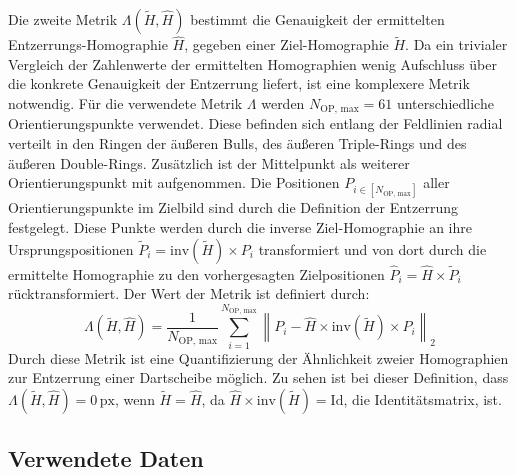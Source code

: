 Die zweite Metrik $\Lambda(\widetilde{H}, \widehat{H})$ bestimmt die Genauigkeit der ermittelten Entzerrungs-Homographie $\widehat{H}$, gegeben einer Ziel-Homographie $\widetilde{H}$. Da ein trivialer Vergleich der Zahlenwerte der ermittelten Homographien wenig Aufschluss über die konkrete Genauigkeit der Entzerrung liefert, ist eine komplexere Metrik notwendig. Für die verwendete Metrik $\Lambda$ werden $N_\text{OP, max}=61$ unterschiedliche Orientierungspunkte verwendet. Diese befinden sich entlang der Feldlinien radial verteilt in den Ringen der äußeren Bulls, des äußeren Triple-Rings und des äußeren Double-Rings. Zusätzlich ist der Mittelpunkt als weiterer Orientierungspunkt mit aufgenommen. Die Positionen $P_{i \in [N_\text{OP, max}]}$ aller Orientierungspunkte im Zielbild sind durch die Definition der Entzerrung festgelegt. Diese Punkte werden durch die inverse Ziel-Homographie an ihre Ursprungspositionen $\widetilde{P}_i = \mathrm{inv}(\widetilde{H}) \times P_i$ transformiert und von dort durch die ermittelte Homographie zu den vorhergesagten Zielpositionen $\widehat{P}_i = \widehat{H} \times \widetilde{P}_i$ rücktransformiert. Der Wert der Metrik ist definiert durch:
\[ \Lambda(\widetilde{H}, \widehat{H}) = \frac{1}{N_\text{OP, max}} \sum_{i = 1}^{N_\text{OP, max}} \left\lVert P_i - \widehat{H} \times \mathrm{inv}(\widetilde{H}) \times P_i \right\rVert _2  \]
Durch diese Metrik ist eine Quantifizierung der Ähnlichkeit zweier Homographien zur Entzerrung einer Dartscheibe möglich. Zu sehen ist bei dieser Definition, dass $\Lambda(\widetilde{H}, \widehat{H}) = 0\,\text{px}$, wenn $\widetilde{H} = \widehat{H}$, da $\widehat{H} \times \mathrm{inv}(\widetilde{H}) = \text{Id}$, die Identitätsmatrix, ist.


\subsection{Verwendete Daten}
\label{sec:cv_ergebnisse_daten}

